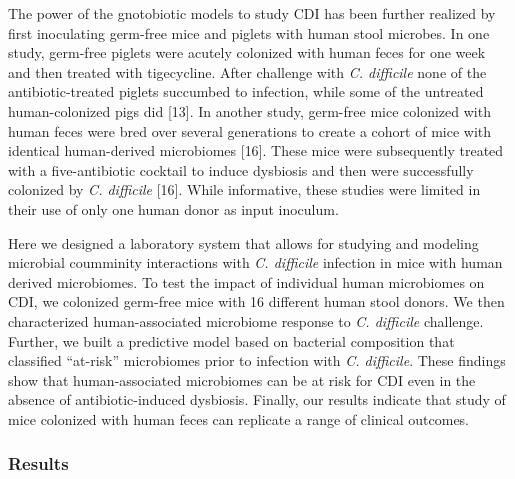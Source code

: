 \documentclass[11pt,]{article}
\begin{document}
The power of the gnotobiotic models to study CDI has been further
realized by first inoculating germ-free mice and piglets with human
stool microbes. In one study, germ-free piglets were acutely colonized
with human feces for one week and then treated with tigecycline. After
challenge with \emph{C. difficile} none of the antibiotic-treated
piglets succumbed to infection, while some of the untreated
human-colonized pigs did {[}13{]}. In another study, germ-free mice
colonized with human feces were bred over several generations to create
a cohort of mice with identical human-derived microbiomes {[}16{]}.
These mice were subsequently treated with a five-antibiotic cocktail to
induce dysbiosis and then were successfully colonized by \emph{C.
difficile} {[}16{]}. While informative, these studies were limited in
their use of only one human donor as input inoculum.

Here we designed a laboratory system that allows for studying and
modeling microbial coumminity interactions with \emph{C. difficile}
infection in mice with human derived microbiomes. To test the impact of
individual human microbiomes on CDI, we colonized germ-free mice with 16
different human stool donors. We then characterized human-associated
microbiome response to \emph{C. difficile} challenge. Further, we built
a predictive model based on bacterial composition that classified
``at-risk'' microbiomes prior to infection with \emph{C. difficile}.
These findings show that human-associated microbiomes can be at risk for
CDI even in the absence of antibiotic-induced dysbiosis. Finally, our
results indicate that study of mice colonized with human feces can
replicate a range of clinical outcomes.

\subsubsection{Results}\label{results}
\end{document}
